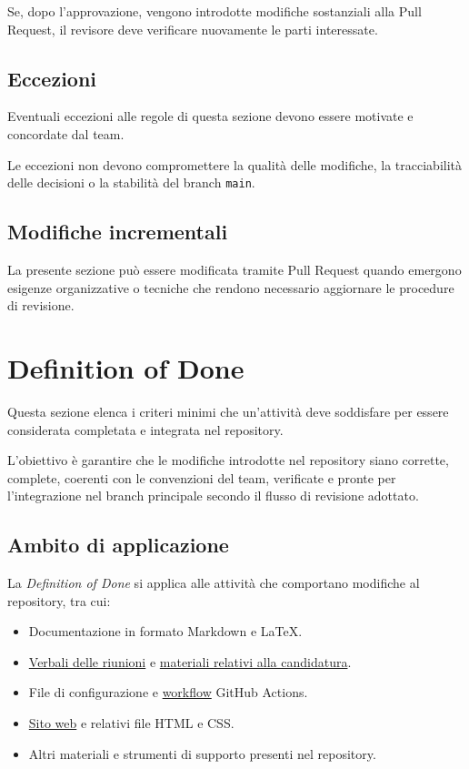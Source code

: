 \documentclass[11pt, a4paper]{article}
\begin{document}
Se, dopo l'approvazione, vengono introdotte modifiche sostanziali alla Pull Request, il revisore deve verificare nuovamente le parti interessate.

\subsection{Eccezioni}

Eventuali eccezioni alle regole di questa sezione devono essere motivate e concordate dal team.

Le eccezioni non devono compromettere la qualità delle modifiche, la tracciabilità delle decisioni o la stabilità del branch \texttt{main}.

\subsection{Modifiche incrementali}

La presente sezione può essere modificata tramite Pull Request quando emergono esigenze organizzative o tecniche che rendono necessario aggiornare le procedure di revisione.

\section{Definition of Done}

Questa sezione elenca i criteri minimi che un'attività deve soddisfare per essere considerata completata e integrata nel repository.

L'obiettivo è garantire che le modifiche introdotte nel repository siano corrette, complete, coerenti con le convenzioni del team, verificate e pronte per l'integrazione nel branch principale secondo il flusso di revisione adottato.

\subsection{Ambito di applicazione}

La \textit{Definition of Done} si applica alle attività che comportano modifiche al repository, tra cui:
\begin{itemize}
    \item Documentazione in formato Markdown e LaTeX.
    \item \href{https://github.com/On-By-One-Team/On-By-One.github.io/tree/main/docs/pdf/verbali}{Verbali delle riunioni} e \href{https://github.com/On-By-One-Team/On-By-One.github.io/tree/main/docs/pdf/candidatura}{materiali relativi alla candidatura}.
    \item File di configurazione e \href{https://github.com/On-By-One-Team/On-By-One.github.io/tree/main/.github/workflows}{workflow} GitHub Actions.
    \item \href{https://on-by-one-team.github.io/On-By-One.github.io/}{Sito web} e relativi file HTML e CSS.
    \item Altri materiali e strumenti di supporto presenti nel repository.
\end{itemize}
\end{document}
